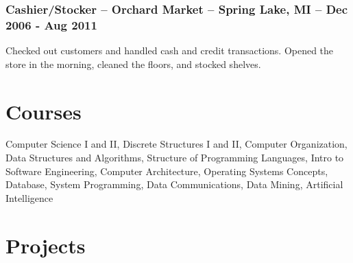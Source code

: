 \documentclass{article}
\begin{document}
		\subsubsection{Cashier/Stocker -- Orchard Market -- Spring Lake, MI -- Dec 2006 - Aug 2011}
			\begin{addmargin}[1em]{0em}
				Checked out customers and handled cash and credit transactions. Opened the store in the morning, cleaned the floors, and stocked shelves.
			\end{addmargin}

	\section*{Courses}
		\begin{addmargin}[1em]{0em}
			Computer Science I and II, Discrete Structures I and II, Computer Organization, Data Structures and Algorithms, Structure of Programming Languages, Intro to Software Engineering, Computer Architecture, Operating Systems Concepts, Database, System Programming, Data Communications, Data Mining, Artificial Intelligence
		\end{addmargin}

	\section*{Projects}


\end{document}
